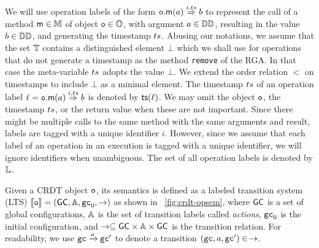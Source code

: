 We will use operation labels of the form
${{\mathtt{o}.\mathsf{m}}}(a) \overset{i,ts}{\Rightarrow} b$ to represent the call of a
method $\mathsf{m} \in \mathbb{M}$ of object $\mathtt{o}\in \mathbb{O}$, with
argument $a \in \mathbb{DD}$, resulting in the value $b \in
\mathbb{DD}$, and generating the timestamp $ts$.
Abusing our notations, we assume that the set $\mathbb{T}$
contains a distinguished element $\bot$ which we shall use for
operations that do not generate a timestamp as the method {\tt remove}
of the RGA.
In that case the meta-variable $ts$ adopts the value $\bot$. We extend the order
relation $<$ on timestamps to include $\bot$ as a minimal element.
The timestamp $ts$ of an operation label $\ell={{\mathtt{o}.\mathsf{m}}}(a) \overset{i,ts}{\Rightarrow} b$
is denoted by $\mathsf{ts}(\ell)$.
We may omit the object $\mathtt{o}$, the timestamp $ts$, or the return
value when these are not important.
Since there might be multiple calls to the same method with the same
arguments and result, labels are tagged with a unique identifier $i$.
However, since we assume that each label of an operation in an
execution is tagged with a unique identifier, we will ignore
identifiers when unambiguous.
The set of all operation labels is denoted by $\mathbb{L}$.

Given a CRDT object $\mathtt{o}$, its semantics is defined as a labeled transition
system (LTS) $\llbracket \mathtt{o} \rrbracket =
(\mathsf{GC},\mathbb{A},\mathtt{gc}_0,\rightarrow)$ as shown in
\figurename~\ref{fig:crdt-opsem}, where $\mathsf{GC}$ is a set of
global configurations, $\mathbb{A}$ is the set of transition labels called \emph{actions},
$\mathtt{gc}_0$ is the initial configuration, and
$\rightarrow\subseteq \mathsf{GC} \times \mathbb{A}\times \mathsf{GC}$ is the
transition relation. For readability, we use $\mathtt{gc} \xrightarrow{a} \mathtt{gc}'$
to denote a transition $(\mathtt{gc},a,\mathtt{gc}')\in\,\rightarrow$.

